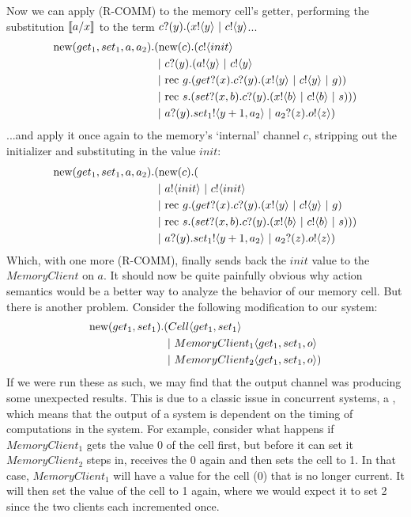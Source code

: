 Now we can apply (R-COMM) to the memory cell's getter, performing the substitution $\llbracket{a}/{x}\rrbracket$ to the term ${c}?({y}).({x}!\langle{y}\rangle\ |\  {c}!\langle{y}\rangle$...
\begin{equation}\begin{split}
	\text{new}({get_1, set_1,a,a_2}).&(\text{new}({c}). ({c}!\langle{init}\rangle \\
		&\ |\  {c}?({y}).({a}!\langle{y}\rangle\ |\  {c}!\langle{y}\rangle \\
		&\ |\ \text{rec }{g}.({get}?({x}).{c}?({y}).({x}!\langle{y}\rangle\ |\  {c}!\langle{y}\rangle\ |\  g))\\
		&\ |\ \text{rec }{s}.({set}?({x,b}).{c}?({y}).({x}!\langle{b}\rangle\ |\ {c}!\langle{b}\rangle\ |\  s)))\\
		&\ |\  {a}?({y}). {set_1}!\langle{y+1,a_2}\rangle \ |\  {a_2}?({z}).{o}!\langle{z}\rangle)
\end{split}\end{equation}
...and apply it once again to the memory's `internal' channel $c$, stripping out the initializer and substituting in the value $init$:
\begin{equation}\begin{split}
	\text{new}({get_1, set_1,a,a_2}).&(\text{new}({c}). (\\
		&\ |\  {a}!\langle{init}\rangle\ |\  {c}!\langle{init}\rangle \\
		&\ |\ \text{rec }{g}.({get}?({x}).{c}?({y}).({x}!\langle{y}\rangle\ |\  {c}!\langle{y}\rangle\ |\  g)\\
		&\ |\ \text{rec }{s}.({set}?({x,b}).{c}?({y}).({x}!\langle{b}\rangle\ |\ {c}!\langle{b}\rangle\ |\  s)))\\
		&\ |\  {a}?({y}). {set_1}!\langle{y+1,a_2}\rangle \ |\  {a_2}?({z}).{o}!\langle{z}\rangle)
\end{split}\end{equation}
Which, with one more (R-COMM), finally sends back the $init$ value to the $MemoryClient$ on $a$.  
It should now be quite painfully obvious why action semantics would be a better way to analyze the behavior of our memory cell.  
But there is another problem.  
Consider the following modification to our system:
\begin{equation}\begin{split}
	\text{new}({get_1,set_1}).&(Cell\langle get_1, set_1\rangle\\
	 &\ |\   MemoryClient_1\langle get_1,set_1,o\rangle \\
	 &\ |\   MemoryClient_2\langle get_1,set_1,o\rangle)\\
\end{split}\end{equation}
If we were run these as such, we may find that the output channel was producing some unexpected results.  
This is due to a classic issue in concurrent systems, a , which means that the output of a system is dependent on the timing of computations in the system.
For example, consider what happens if $MemoryClient_1$ gets the value 0 of the cell first, but before it can set it $MemoryClient_2$ steps in, receives the 0 again and then sets the cell to 1.  
In that case, $MemoryClient_1$ will have a value for the cell (0) that is no longer current.  
It will then set the value of the cell to 1 again, where we would expect it to set 2 since the two clients each incremented once.

